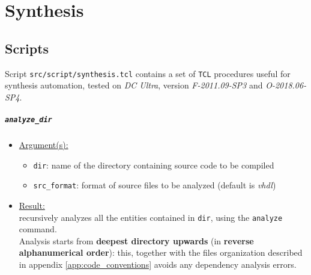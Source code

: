 \chapter{Synthesis}
\label{chap:synthesis}

\lstset{
	basicstyle=\tiny,
	frame=single,
	breaklines=true
}

\section{Scripts}
Script \texttt{src/script/synthesis.tcl} contains a set of \texttt{TCL}
procedures useful for synthesis automation, tested on
\textit{DC Ultra}, version \textit{F-2011.09-SP3} and \textit{O-2018.06-SP4}.

\paragraph{\texttt{analyze\_dir}}
\begin{itemize}
	\item \underline{Argument(s):}
		\begin{itemize}
			\item \texttt{dir}: name of the directory containing
				source code to be compiled
			\item \texttt{src\_format}: format of source files
				to be analyzed (default is \textit{vhdl})
		\end{itemize}
	\item \underline{Result:} \\
		recursively analyzes all the entities contained in \texttt{dir},
		using the \texttt{analyze} command. \\
		Analysis starts from \textbf{deepest directory upwards} (in
		\textbf{reverse alphanumerical order}): this, together with the
		files organization described in appendix
		\ref{app:code_conventions} avoids any dependency analysis errors.
\end{itemize}

